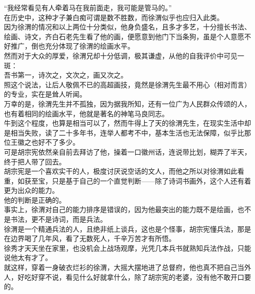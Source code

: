 \begin{multicols}{\theparacolNo}
“我经常看见有人牵着马在我前面走，我可能是管马的。”\\

在历史中，这种才子兼白痴可谓是数不胜数，而徐渭似乎也应归入此类。\\

因为徐渭的情况和以上两位十分类似，他身负盛名，且多才多艺，十分擅长书法、绘画、诗文，齐白石老先生看了他的画，便愿意到他门下当条狗，虽是个人意愿不好推广，倒也充分体现了徐渭的绘画水平。\\

然而对于大众的厚爱，徐渭兄却十分低调，极其谦虚，从他的自我评价中可见一斑：\\

吾书第一，诗次之，文次之，画又次之。\\

照这个说法，让后人敬佩不已的高超画技，竟然是徐渭先生最不用心（相对而言）的专业，实在是耸人听闻。\\

万幸的是，徐渭先生并不孤独，因为据我所知，还有一位广为人民群众传颂的人，也有着相同的绘画水平，他就是著名的神笔马良同志。\\

牛到这个程度，也算是相当可以了，然而牛得上了天的徐渭先生，在现实生活中却是相当失败，读了二十多年书，连举人都考不中，基本生活也无法保障，似乎比那位王徽之也好不了多少。\\

可是胡宗宪依然亲自前去拜访了他，操着一口徽州话，连说带比划，糊弄了半天，终于把人带了回去。\\

胡宗宪是一个喜欢实干的人，极度讨厌说空话的文人，而他之所以对徐渭如此看重，如获至宝，只是基于自己的一个直觉判断——除了诗词书画外，这个人还有着更为出众的能力。\\

他的判断是正确的。\\

事实上，徐渭对自己的能力排序是错误的，因为他最突出的能力既不是绘画，也不是书法，更不是诗词，而是兵法。\\

徐渭是一个精通兵法的人，且绝非纸上谈兵，这也是个怪事，胡宗宪懂兵法，那是在边界喝了几年风，看了无数死人，千辛万苦才有所悟。\\

徐秀才天天坐在家里，也没机会上战场观摩，光凭几本兵书就熟知兵法作战，只能说他太有才了。\\

就这样，穿着一身破衣烂衫的徐渭，大摇大摆地进了总督府，他也真不把自己当外人，好吃好穿不说，看见什么好就拿什么，除了胡宗宪的老婆，没有他不敢开口要的。\\


\end{multicols}
